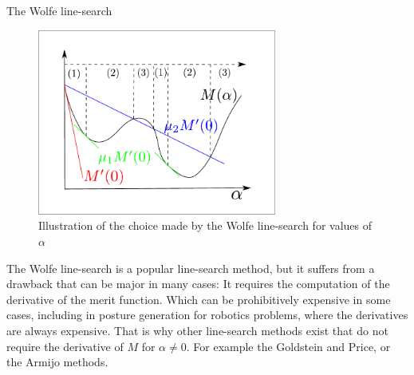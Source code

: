 \begin{algorithm}
\begin{algorithmic}
  \EndLoop{}
  \caption{The Wolfe line-search}
\label{alg:Wolfe}
\end{algorithmic}
\end{algorithm}

\begin{figure}
  \centering
  \includegraphics[width=0.7\textwidth]{line-search.pdf}
  \caption{Illustration of the choice made by the Wolfe line-search for values of $\alpha$}
\label{fig:Wolfe}
\end{figure}

The Wolfe line-search is a popular line-search method, but it suffers from a drawback that can be major in many cases: It requires the computation of the derivative of the merit function.
Which can be prohibitively expensive in some cases, including in posture generation for robotics problems, where the derivatives are always expensive.
That is why other line-search methods exist that do not require the derivative of $M$ for $\alpha\neq0$. For example the Goldstein and Price, or the Armijo methods.

